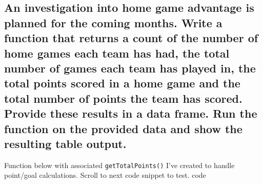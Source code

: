 \documentclass[
]{article}
\begin{document}
\hypertarget{an-investigation-into-home-game-advantage-is-planned-for-the-coming-months.-write-a-function-that-returns-a-count-of-the-number-of-home-games-each-team-has-had-the-total-number-of-games-each-team-has-played-in-the-total-points-scored-in-a-home-game-and-the-total-number-of-points-the-team-has-scored.-provide-these-results-in-a-data-frame.-run-the-function-on-the-provided-data-and-show-the-resulting-table-output.}{%
\subsection{An investigation into home game advantage is planned for the
coming months. Write a function that returns a count of the number of
home games each team has had, the total number of games each team has
played in, the total points scored in a home game and the total number
of points the team has scored. Provide these results in a data frame.
Run the function on the provided data and show the resulting table
output.}\label{an-investigation-into-home-game-advantage-is-planned-for-the-coming-months.-write-a-function-that-returns-a-count-of-the-number-of-home-games-each-team-has-had-the-total-number-of-games-each-team-has-played-in-the-total-points-scored-in-a-home-game-and-the-total-number-of-points-the-team-has-scored.-provide-these-results-in-a-data-frame.-run-the-function-on-the-provided-data-and-show-the-resulting-table-output.}}

Function below with associated \texttt{getTotalPoints()} I've created to
handle point/goal calculations. Scroll to next code snippet to test.
code
\end{document}
